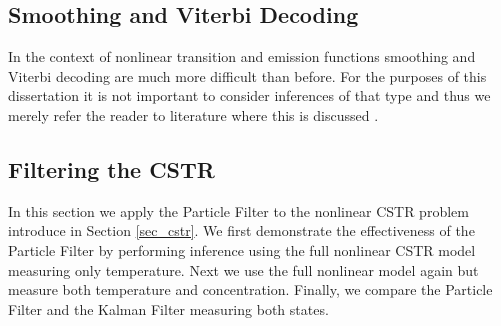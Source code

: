 \subsection{Smoothing and Viterbi Decoding}
In the context of nonlinear transition and emission functions smoothing and Viterbi decoding are much more difficult than before. For the purposes of this dissertation it is not important to consider inferences of that type and thus we merely refer the reader to literature where this is discussed \cite{barber}\cite{pftut}\cite{gsf1}\cite{murphy1}\cite{murphy2}.

\subsection{Filtering the CSTR}
\label{sec_nonlinmods_filtering}
In this section we apply the Particle Filter to the nonlinear CSTR problem introduce in Section \ref{sec_cstr}. We first demonstrate the effectiveness of the Particle Filter by performing inference using the full nonlinear CSTR model measuring only temperature. Next we use the full nonlinear model again but measure both temperature and concentration. Finally, we compare the Particle Filter and the Kalman Filter measuring both states.

